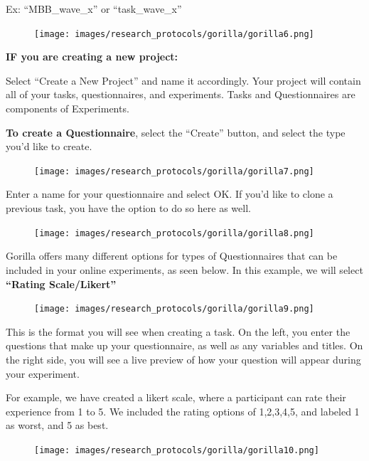 \documentclass[
]{book}
\begin{document}
Ex: ``MBB\_wave\_x'' or ``task\_wave\_x''

\begin{figure}
\centering
\texttt{[image: images/research\_protocols/gorilla/gorilla6.png]}
\caption{}
\end{figure}

\textbf{IF you are creating a new project:}

Select ``Create a New Project'' and name it accordingly. Your project will contain all of your tasks, questionnaires, and experiments. Tasks and Questionnaires are components of Experiments.

\textbf{To create a Questionnaire}, select the ``Create'' button, and select the type you'd like to create.

\begin{figure}
\centering
\texttt{[image: images/research\_protocols/gorilla/gorilla7.png]}
\caption{}
\end{figure}

Enter a name for your questionnaire and select OK. If you'd like to clone a previous task, you have the option to do so here as well.

\begin{figure}
\centering
\texttt{[image: images/research\_protocols/gorilla/gorilla8.png]}
\caption{}
\end{figure}

Gorilla offers many different options for types of Questionnaires that can be included in your online experiments, as seen below. In this example, we will select \textbf{``Rating Scale/Likert''}

\begin{figure}
\centering
\texttt{[image: images/research\_protocols/gorilla/gorilla9.png]}
\caption{}
\end{figure}

This is the format you will see when creating a task. On the left, you enter the questions that make up your questionnaire, as well as any variables and titles. On the right side, you will see a live preview of how your question will appear during your experiment.

For example, we have created a likert scale, where a participant can rate their experience from 1 to 5. We included the rating options of 1,2,3,4,5, and labeled 1 as worst, and 5 as best.

\begin{figure}
\centering
\texttt{[image: images/research\_protocols/gorilla/gorilla10.png]}
\caption{}
\end{figure}
\end{document}
